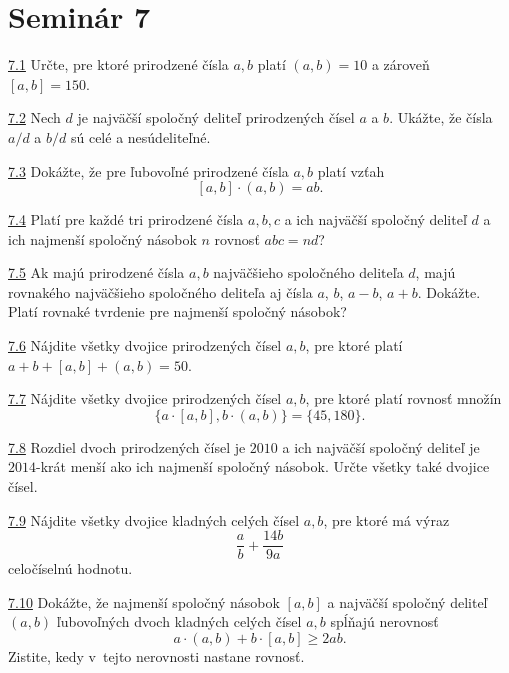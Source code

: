 \section*{Seminár 7}

\noindent \ul{7.1}  Určte, pre ktoré prirodzené čísla $a, b$ platí $(a, b) = 10$ a zároveň  $[a, b] = 150$.




\noindent \ul{7.2}  Nech $d$ je najväčší spoločný deliteľ prirodzených čísel $a$ a $b$. Ukážte, že čísla $a/d$ a $b/d$ sú celé a nesúdeliteľné.




\noindent \ul{7.3}  Dokážte, že pre ľubovoľné prirodzené čísla $a, b$ platí vzťah $$[a, b] \cdot (a, b) = ab.$$




\noindent \ul{7.4}  Platí pre každé tri prirodzené čísla $a, b, c$ a ich najväčší spoločný deliteľ $d$ a ich najmenší spoločný násobok $n$ rovnosť $abc = nd$?




\noindent \ul{7.5}  Ak majú prirodzené čísla $a, b$ najväčšieho spoločného deliteľa $d$, majú rovnakého najväčšieho spoločného deliteľa aj čísla $a$, $b$, $a - b$, $a + b$. Dokážte. Platí rovnaké tvrdenie pre najmenší spoločný násobok?




\noindent \ul{7.6}  Nájdite všetky dvojice prirodzených čísel $a, b$, pre ktoré platí $a+b+[a, b]+(a, b) = 50$.




\noindent \ul{7.7} 
Nájdite všetky dvojice prirodzených čísel $a, b$, pre ktoré platí rovnosť množín
$$\{a \cdot [a, b], b \cdot (a, b)\} = \{45, 180\}.$$




\noindent \ul{7.8} 
Rozdiel dvoch prirodzených čísel je $2010$ a ich najväčší spoločný deliteľ je $2014$-krát menší ako ich najmenší spoločný násobok. Určte všetky také dvojice čísel.




\noindent \ul{7.9}  Nájdite všetky dvojice kladných celých čísel $a, b$, pre ktoré má výraz
$$\frac{a}{b}+\frac{14b}{9a}$$
celočíselnú hodnotu.




\noindent \ul{7.10} 
Dokážte, že najmenší spoločný násobok $[a, b]$ a najväčší spoločný deliteľ $(a, b)$ ľubovoľných dvoch kladných celých čísel $a, b$ spĺňajú nerovnosť
$$a \cdot (a, b) + b \cdot [a, b] \geq 2ab.$$
Zistite, kedy v~tejto nerovnosti nastane rovnosť.




